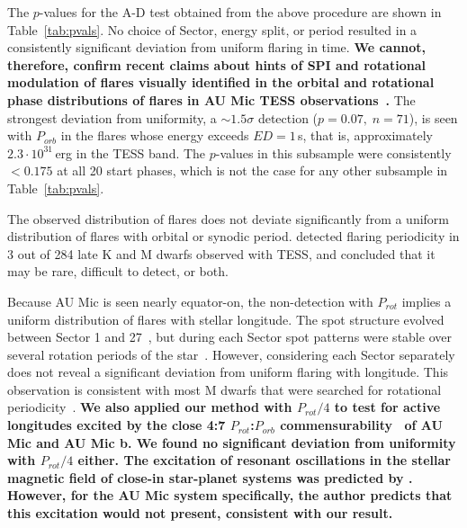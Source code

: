 \documentclass[fleqn,usenatbib]{mnras}%
\begin{document}
The $p$-values for the A-D test obtained from the above procedure are shown in Table~\ref{tab:pvals}. No choice of Sector, energy split, or period resulted in a consistently significant deviation from uniform flaring in time. \textbf{We cannot, therefore, confirm recent claims about hints of SPI and rotational modulation of flares visually identified in the orbital and rotational phase distributions of flares in AU Mic TESS observations~\citep{colombo2022short}.} The strongest deviation from uniformity, a $\sim1.5\sigma$ detection ($p=0.07,\;n=71$), is seen with $P_{orb}$ in the flares whose energy exceeds $ED=1$\,s, that is, approximately $2.3\cdot10^{31}\,$erg in the TESS band. The $p$-values in this subsample were consistently $<0.175$ at all 20 start phases, which is not the case for any other subsample in Table~\ref{tab:pvals}.

The observed distribution of flares does not deviate significantly from a uniform distribution of flares with orbital or synodic period. \citet{howard2021evryflare} detected flaring periodicity in 3 out of 284 late K and M dwarfs observed with TESS, and concluded that it may be rare, difficult to detect, or both.

Because AU Mic is seen nearly equator-on, the non-detection with $P_{rot}$ implies a uniform distribution of flares with stellar longitude. The spot structure evolved between Sector 1 and 27~\citep{martioli2021new}, but during each Sector spot patterns were stable over several rotation periods of the star~\citep{szabo2021changing}. However, considering each Sector separately does not reveal a significant deviation from uniform flaring with longitude. This observation is consistent with most M dwarfs that were searched for rotational periodicity~\citep{doyle2018, doyle2019}. \textbf{We also applied our method with $P_{rot}/4$ to test for active longitudes excited by the close 4:7 $P_{rot}$:$P_{orb}$ commensurability~\citep{szabo2021changing,cale2021diving} of AU Mic and AU Mic b. We found no significant deviation from uniformity with $P_{rot}/4$ either. The excitation of resonant oscillations in the stellar magnetic field of close-in star-planet systems was predicted by \citet{lanza2022model}. However, for the AU Mic system specifically, the author predicts that this excitation would not present, consistent with our result.}
 
\end{document}
